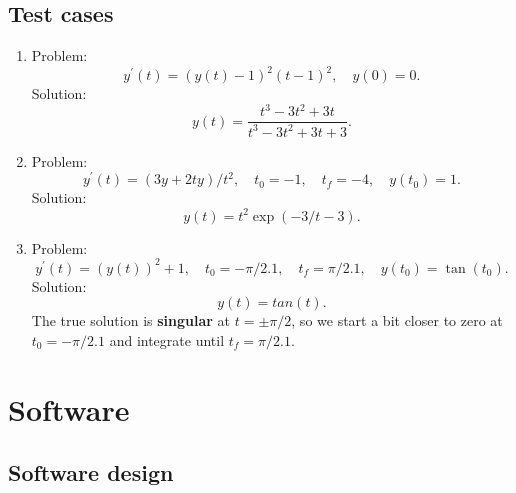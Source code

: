\documentclass[]{article}
\begin{document}
\subsection{Test cases}
\begin{enumerate}
\item Problem:
$$
y^{\prime}(t) = (y(t) - 1)^2 (t - 1)^2, \quad y(0) = 0.
$$
Solution:
$$
y(t) = \frac{t^3 - 3 t^2 + 3 t}{t^3 - 3 t^2 + 3 t + 3}.
$$
\item Problem:
$$
y^{\prime}(t) = (3 y + 2 t y) / t^2, \quad t_0 = -1, \quad t_f = -4, \quad y(t_0) = 1.
$$
Solution:
$$
y(t) = t^2 \exp{(-3/t - 3)}.
$$
\item Problem:
$$
y^{\prime}(t) = (y(t))^2 + 1, \quad t_0 = -\pi/2.1, \quad t_f = \pi/2.1, \quad y(t_0) = \tan(t_0).
$$
Solution:
$$
y(t) = tan(t).
$$
The true solution is \textbf{singular} at $t = \pm\pi/2$, so we start a bit closer to zero at $t_0 = -\pi/2.1$ and integrate until $t_f = \pi/2.1$.
\end{enumerate}

\section{Software}

\subsection{Software design}
\end{document}
